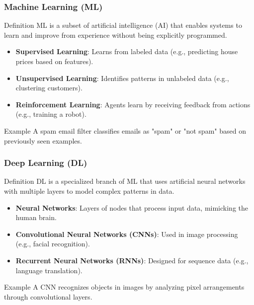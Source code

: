 \documentclass{beamer}
\begin{document}
\begin{frame}[fragile]
    \frametitle{Machine Learning (ML)}
    \begin{block}{Definition}
        ML is a subset of artificial intelligence (AI) that enables systems to learn and improve from experience without being explicitly programmed.
    \end{block}
    
    \begin{itemize}
        \item \textbf{Supervised Learning}: Learns from labeled data (e.g., predicting house prices based on features).
        \item \textbf{Unsupervised Learning}: Identifies patterns in unlabeled data (e.g., clustering customers).
        \item \textbf{Reinforcement Learning}: Agents learn by receiving feedback from actions (e.g., training a robot).
    \end{itemize}
    
    \begin{block}{Example}
        A spam email filter classifies emails as "spam" or "not spam" based on previously seen examples.
    \end{block}
\end{frame}

\begin{frame}[fragile]
    \frametitle{Deep Learning (DL)}
    \begin{block}{Definition}
        DL is a specialized branch of ML that uses artificial neural networks with multiple layers to model complex patterns in data.
    \end{block}
    
    \begin{itemize}
        \item \textbf{Neural Networks}: Layers of nodes that process input data, mimicking the human brain.
        \item \textbf{Convolutional Neural Networks (CNNs)}: Used in image processing (e.g., facial recognition).
        \item \textbf{Recurrent Neural Networks (RNNs)}: Designed for sequence data (e.g., language translation).
    \end{itemize}
    
    \begin{block}{Example}
        A CNN recognizes objects in images by analyzing pixel arrangements through convolutional layers.
    \end{block}
\end{frame}
\end{document}
